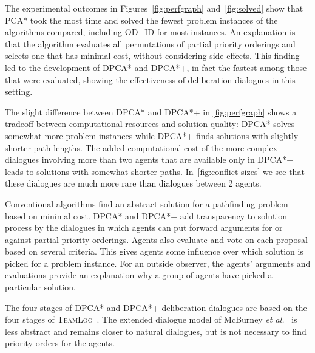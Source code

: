 
The experimental outcomes in Figures~\ref{fig:perfgraph} and~\ref{fig:solved} show that PCA* took the most 
time and solved the fewest problem instances of the algorithms compared, including OD+ID for most instances. An explanation is that the algorithm 
evaluates all permutations of partial priority orderings and selects one that has
minimal cost, without considering side-effects. This finding led to the development of DPCA* and DPCA*+, in fact the fastest among those that were evaluated, showing the effectiveness of deliberation 
dialogues in this setting.

The slight difference between DPCA* and DPCA*+ in \autoref{fig:perfgraph} shows a tradeoff between computational resources and solution quality: DPCA* solves somewhat more problem 
instances while DPCA*+ finds solutions with slightly shorter path lengths.
The added computational cost of the more complex dialogues involving more than two agents that are available only in DPCA*+ leads to solutions with somewhat shorter paths. In~\autoref{fig:conflict-sizes} we see that these dialogues are much more rare than dialogues between 2 agents. 

Conventional algorithms find an abstract solution for a pathfinding problem based on minimal cost. DPCA* and DPCA*+ add transparency to solution process by the dialogues in which agents can put forward arguments for or against 
partial 
priority orderings. Agents also evaluate and vote on each proposal based on several 
criteria. This gives agents some influence over which solution 
is picked for a problem instance. For an outside observer, the agents' arguments and evaluations provide an explanation why a group of agents have picked a particular 
solution. 

The four stages of DPCA* and DPCA*+ deliberation dialogues are based on the 
four stages of \textsc{TeamLog}~\cite{dunin-keplicz2011}. The extended dialogue model of 
McBurney \emph{et al.}~ is less abstract and remains closer to natural dialogues, but is not necessary to find 
priority orders for the agents. 

